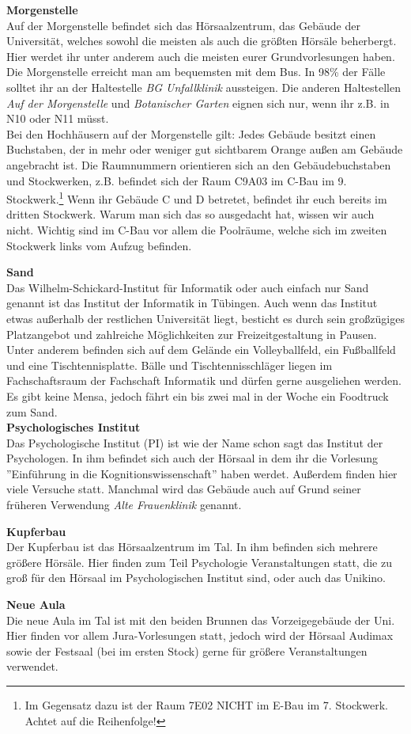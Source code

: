 \textbf{Morgenstelle}\\
Auf der Morgenstelle befindet sich das Hörsaalzentrum, das Gebäude der Universität, welches sowohl die meisten als auch die größten Hörsäle beherbergt. Hier werdet ihr unter anderem auch die meisten eurer Grundvorlesungen haben.\\
Die Morgenstelle erreicht man am bequemsten mit dem Bus. In 98\% der Fälle solltet ihr an der Haltestelle \emph{BG Unfallklinik} aussteigen. Die anderen Haltestellen \emph{Auf der Morgenstelle} und \emph{Botanischer Garten} eignen sich nur, wenn ihr z.B. in N10 oder N11 müsst.\\ Bei den Hochhäusern auf der Morgenstelle gilt: Jedes Gebäude besitzt einen Buchstaben, der in mehr oder weniger gut sichtbarem Orange außen am Gebäude angebracht ist.  Die Raumnummern orientieren sich an den Gebäudebuchstaben und Stockwerken, z.B. befindet sich der Raum C9A03 im C-Bau im 9. Stockwerk.\footnote{Im Gegensatz dazu ist der Raum 7E02 NICHT im E-Bau im 7. Stockwerk. Achtet auf die Reihenfolge!} Wenn ihr Gebäude C und D betretet, befindet ihr euch bereits im dritten Stockwerk. Warum man sich das so ausgedacht hat, wissen wir auch nicht. Wichtig sind im C-Bau vor allem die Poolräume, welche sich im zweiten Stockwerk links vom Aufzug befinden.

\textbf{Sand}\\
Das Wilhelm-Schickard-Institut für Informatik oder auch einfach nur Sand genannt ist das Institut der Informatik in Tübingen. Auch wenn das Institut etwas außerhalb der restlichen Universität liegt, besticht es durch sein großzügiges Platzangebot und zahlreiche Möglichkeiten zur Freizeitgestaltung in Pausen. Unter anderem befinden sich auf dem Gelände ein Volleyballfeld, ein Fußballfeld und eine Tischtennisplatte. Bälle und Tischtennisschläger liegen im Fachschaftsraum der Fachschaft Informatik und dürfen gerne ausgeliehen werden. Es gibt keine Mensa, jedoch fährt ein bis zwei mal in der Woche ein Foodtruck zum Sand.\\

\textbf{Psychologisches Institut}\\
Das Psychologische Institut (PI) ist wie der Name schon sagt das Institut der Psychologen. In ihm befindet sich auch der Hörsaal in dem ihr die Vorlesung ''Einführung in die Kognitionswissenschaft'' haben werdet. Außerdem finden hier viele Versuche statt. Manchmal wird das Gebäude auch auf Grund seiner früheren Verwendung \textit{Alte Frauenklinik} genannt.

\textbf{Kupferbau}\\
Der Kupferbau ist das Hörsaalzentrum im Tal. In ihm befinden sich mehrere größere Hörsäle. Hier finden zum Teil Psychologie Veranstaltungen statt, die zu groß für den Hörsaal im Psychologischen Institut sind, oder auch das Unikino.

\textbf{Neue Aula}\\
Die neue Aula im Tal ist mit den beiden Brunnen das Vorzeigegebäude der Uni. Hier finden vor allem Jura-Vorlesungen statt, jedoch wird der Hörsaal Audimax sowie der Festsaal (bei im ersten Stock) gerne für größere Veranstaltungen verwendet.

\vfill